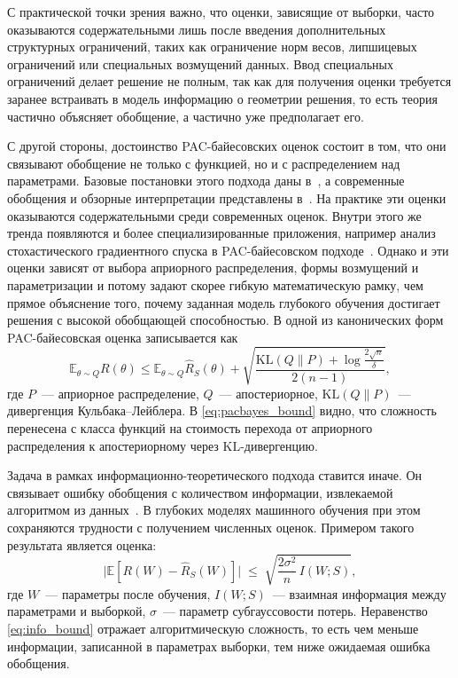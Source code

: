 С практической точки зрения важно, что оценки, зависящие от выборки, часто оказываются содержательными лишь после введения дополнительных структурных ограничений, таких как ограничение норм весов, липшицевых ограничений или специальных возмущений данных.
Ввод специальных ограничений делает решение не полным, так как для получения оценки требуется заранее встраивать в модель информацию о геометрии решения, то есть теория частично объясняет обобщение, а частично уже предполагает его.

С другой стороны, достоинство PAC-байесовских оценок состоит в том, что они связывают обобщение не только с функцией, но и с распределением над параметрами. Базовые постановки этого подхода даны в~\cite{mcallester1999pac,dziugaite2017computing}, а современные обобщения и обзорные интерпретации представлены в~\cite{zhou2018pacbayescompression,pacbayesinterpolating2023,pacbayes2025survey,hellstrom2025perspectives}.
На практике эти оценки оказываются содержательными среди современных оценок.
Внутри этого же тренда появляются и более специализированные приложения, например анализ стохастического градиентного спуска в PAC-байесовском подходе~\cite{pacbayes2019sgd,lottery2022pacbayes}.
Однако и эти оценки зависят от выбора априорного распределения, формы возмущений и параметризации и потому задают скорее гибкую математическую рамку, чем прямое объяснение того, почему заданная модель глубокого обучения достигает решения с высокой обобщающей способностью.
В одной из канонических форм PAC-байесовская оценка записывается как
\begin{equation}
\mathbb E_{\theta\sim Q}R(\theta)\le
\mathbb E_{\theta\sim Q}\hat R_S(\theta)+
\sqrt{\frac{\mathrm{KL}(Q\|P)+\log\frac{2\sqrt n}{\delta}}{2(n-1)}},
\label{eq:pacbayes_bound}
\end{equation}
где $P$~--- априорное распределение, $Q$~--- апостериорное, $\mathrm{KL}(Q\|P)$~--- дивергенция Кульбака--Лейблера. В \eqref{eq:pacbayes_bound} видно, что сложность перенесена с класса функций на стоимость перехода от априорного распределения к апостериорному через $\mathrm{KL}$-дивергенцию.

Задача в рамках информационно-теоретического подхода ставится иначе. Он связывает ошибку обобщения с количеством информации, извлекаемой алгоритмом из данных~\cite{xu2017information}.
В глубоких моделях машинного обучения при этом сохраняются трудности с получением численных оценок.
Примером такого результата является оценка:
\begin{equation}
\bigl|\mathbb E[R(W)-\hat R_S(W)]\bigr|
\;\le\;
\sqrt{\frac{2\sigma^2}{n}\,I(W;S)},
\label{eq:info_bound}
\end{equation}
где $W$~--- параметры после обучения, $I(W;S)$~--- взаимная информация между параметрами и выборкой, $\sigma$~--- параметр субгауссовости потерь.
Неравенство \eqref{eq:info_bound} отражает алгоритмическую сложность, то есть чем меньше информации, записанной в параметрах выборки, тем ниже ожидаемая ошибка обобщения.

